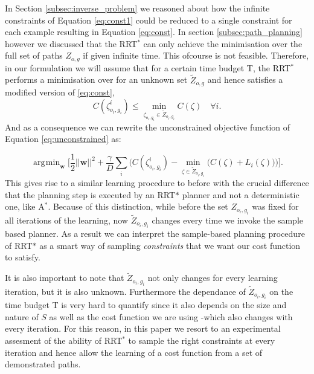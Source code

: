 \documentclass{article}  %
\DeclareMathOperator*{\argmin}{\arg\!\min}
\begin{document}
		In Section \ref{subsec:inverse_problem}  we reasoned about how the infinite constraints of Equation \eqref{eq:const1} could be reduced to a single constraint for each example resulting in Equation \eqref{eq:const}. In section \ref{subsec:path_planning} however we discussed that the RRT$^*$ can only achieve the minimisation over the full set of paths $Z_{o,g}$ if given infinite time.
		This ofcourse is not feasible. Therefore, in our formulation we will assume that for a certain time budget T, the RRT$^*$ performs a minimisation over for an unknown set $\tilde{Z}_{o,g}$ and hence satisfies a modified version of \eqref{eq:const},
\begin{equation}
	C(\zeta^i_{o_i,g_i}) \leq \min_{\zeta_{o_i,g_i} \in \tilde{Z}_{o_i,g_i}} C(\zeta) \quad \forall i. \label{eq:const_rrt}
\end{equation}
	And as a consequence we can rewrite the unconstrained objective function of Equation \eqref{eq:unconstrained} as:

	\begin{equation}
	\argmin_{\mathbf{w}} \big[ \frac{1}{2}||\mathbf{w}||^2 + \frac{\gamma}{D} \sum_i \big( C(\zeta^i_{o_i,g_i}) - \min_{\zeta \in \tilde{Z}_{o_i,g_i}}\big(C(\zeta) + L_i(\zeta)\big) \big) \big]. \label{eq:unconstrained_rrt}
	\end{equation}
	This gives rise to a similar learning procedure to before with the crucial difference that the planning step is executed by an RRT$*$ planner and not a deterministic one, like A$^*$. Because of this distinction, while before the set $Z_{o_i,g_i}$ was fixed for all iterations of the learning, now $\tilde{Z}_{o_i,g_i}$ changes every time we invoke the sample based planner. As a result we can interpret the sample-based planning procedure of RRT$*$ as a smart way of sampling \emph{constraints} that we want our cost function to satisfy.

	It is also important to note that $\tilde{Z}_{o_i,g_i}$ not only changes for every learning iteration, but it is also unknown. Furthermore the dependance of $\tilde{Z}_{o_i,g_i}$ on the time budget T is very hard to quantify since it also depends on the size and nature of $S$ as well as the cost function we are using -which also changes with every iteration. For this reason, in this paper we resort to an experimental assesment of the ability of RRT$^*$ to sample the right constraints at every iteration and hence allow the learning of a cost function from a set of demonstrated paths.
\end{document}

